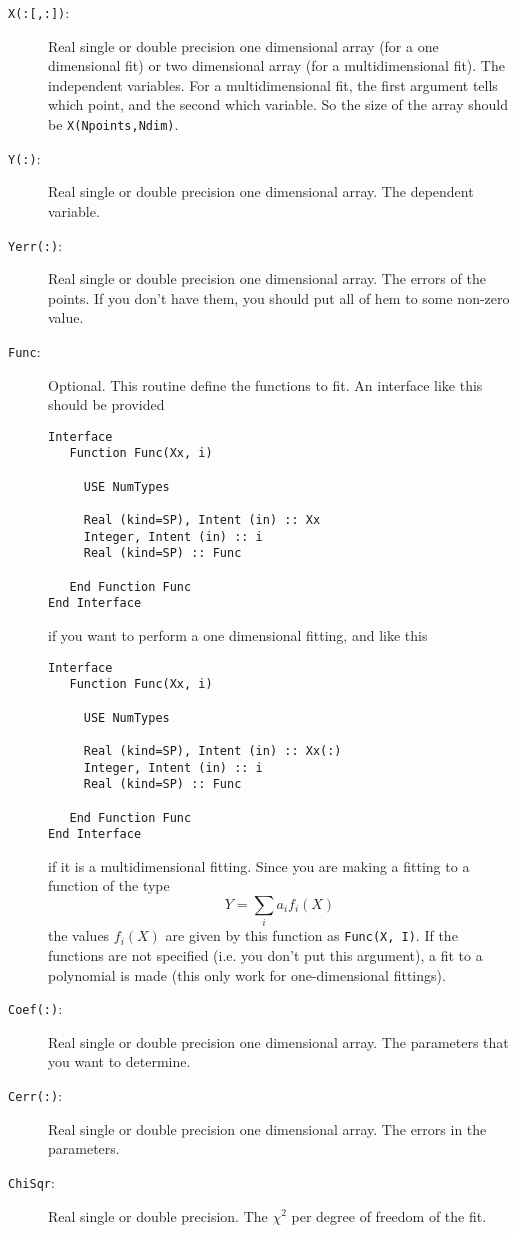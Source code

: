 \begin{description}
\item[\texttt{X(:[,:])}:] Real single or double precision one
  dimensional array (for a one dimensional fit) or two dimensional
  array (for a multidimensional fit). The
  independent variables. For a multidimensional fit, the first argument
  tells which point, and the second which variable. So the size of the
  array should be \texttt{X(Npoints,Ndim)}.
\item[\texttt{Y(:)}: ] Real single or double precision one dimensional
  array. The dependent
  variable.
\item[\texttt{Yerr(:)}:] Real single or double precision one
  dimensional array. The errors
  of the points. If you don't have them, you should put all of hem to
  some non-zero value.
\item[\texttt{Func}:] Optional. This routine define the functions to
  fit. An interface like this should be provided
\begin{verbatim}
Interface
   Function Func(Xx, i)
         
     USE NumTypes

     Real (kind=SP), Intent (in) :: Xx
     Integer, Intent (in) :: i
     Real (kind=SP) :: Func

   End Function Func
End Interface
\end{verbatim}
if you want to perform a one dimensional fitting, and like this
\begin{verbatim}
Interface
   Function Func(Xx, i)
         
     USE NumTypes

     Real (kind=SP), Intent (in) :: Xx(:)
     Integer, Intent (in) :: i
     Real (kind=SP) :: Func

   End Function Func
End Interface
\end{verbatim}
if it is a multidimensional fitting. Since you are making a fitting
to a function of the type
\begin{displaymath}
  Y = \sum_i a_i f_i(X)
\end{displaymath}
the values $f_i(X)$ are given by this function as \texttt{Func(X,
  I)}. If the functions are not specified (i.e. you don't put this
argument), a fit to a polynomial is made (this only work for
one-dimensional fittings).
\item[\texttt{Coef(:)}: ] Real single or double precision one
  dimensional array. The
  parameters that you want to determine.
\item[\texttt{Cerr(:)}:] Real single or double precision one
  dimensional array. The errors
  in the parameters.
\item[\texttt{ChiSqr}: ] Real single or double precision. The $\chi^2$
  per degree of freedom of the fit.
\end{description}

